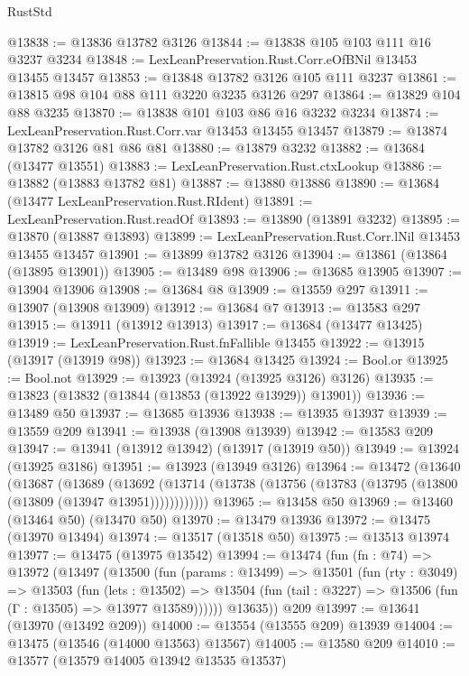 \begin{lexlean}{RustStd}
\begin{coremodule}
@13838 := @13836 @13782 @3126
@13844 := @13838 @105 @103 @111 @16 @3237 @3234
@13848 := LexLeanPreservation.Rust.Corr.eOfBNil @13453 @13455 @13457
@13853 := @13848 @13782 @3126 @105 @111 @3237
@13861 := @13815 @98 @104 @88 @111 @3220 @3235 @3126 @297
@13864 := @13829 @104 @88 @3235
@13870 := @13838 @101 @103 @86 @16 @3232 @3234
@13874 := LexLeanPreservation.Rust.Corr.var @13453 @13455 @13457
@13879 := @13874 @13782 @3126 @81 @86 @81
@13880 := @13879 @3232
@13882 := @13684 (@13477 @13551)
@13883 := LexLeanPreservation.Rust.ctxLookup
@13886 := @13882 (@13883 @13782 @81)
@13887 := @13880 @13886
@13890 := @13684 (@13477 LexLeanPreservation.Rust.RIdent)
@13891 := LexLeanPreservation.Rust.readOf
@13893 := @13890 (@13891 @3232)
@13895 := @13870 (@13887 @13893)
@13899 := LexLeanPreservation.Rust.Corr.lNil @13453 @13455 @13457
@13901 := @13899 @13782 @3126
@13904 := @13861 (@13864 (@13895 @13901))
@13905 := @13489 @98
@13906 := @13685 @13905
@13907 := @13904 @13906
@13908 := @13684 @8
@13909 := @13559 @297
@13911 := @13907 (@13908 @13909)
@13912 := @13684 @7
@13913 := @13583 @297
@13915 := @13911 (@13912 @13913)
@13917 := @13684 (@13477 @13425)
@13919 := LexLeanPreservation.Rust.fnFallible @13455
@13922 := @13915 (@13917 (@13919 @98))
@13923 := @13684 @13425
@13924 := Bool.or
@13925 := Bool.not
@13929 := @13923 (@13924 (@13925 @3126) @3126)
@13935 := @13823 (@13832 (@13844 (@13853 (@13922 @13929)) @13901))
@13936 := @13489 @50
@13937 := @13685 @13936
@13938 := @13935 @13937
@13939 := @13559 @209
@13941 := @13938 (@13908 @13939)
@13942 := @13583 @209
@13947 := @13941 (@13912 @13942) (@13917 (@13919 @50))
@13949 := @13924 (@13925 @3186)
@13951 := @13923 (@13949 @3126)
@13964 := @13472
    (@13640
      (@13687
        (@13689
          (@13692 (@13714 (@13738 (@13756 (@13783 (@13795 (@13800 (@13809 (@13947 @13951))))))))))))
@13965 := @13458 @50
@13969 := @13460 (@13464 @50) (@13470 @50)
@13970 := @13479 @13936
@13972 := @13475 (@13970 @13494)
@13974 := @13517 (@13518 @50)
@13975 := @13513 @13974
@13977 := @13475 (@13975 @13542)
@13994 := @13474
    (fun (fn : @74) =>
    @13972
      (@13497
        (@13500
          (fun (params : @13499) =>
          @13501
            (fun (rty : @3049) =>
            @13503
              (fun (lets : @13502) =>
              @13504 (fun (tail : @3227) => @13506 (fun (Γ : @13505) => @13977 @13589))))))
        @13635))
    @209
@13997 := @13641 (@13970 (@13492 @209))
@14000 := @13554 (@13555 @209) @13939
@14004 := @13475 (@13546 (@14000 @13563) @13567)
@14005 := @13580 @209
@14010 := @13577 (@13579 @14005 @13942 @13535 @13537)

\end{coremodule}
\end{lexlean}
